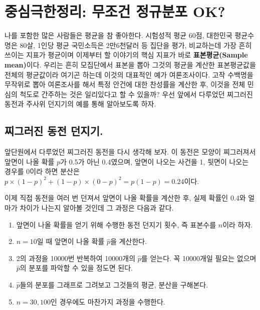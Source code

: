 \documentclass[]{book}
\providecommand{\tightlist}{%
  \setlength{\itemsep}{0pt}\setlength{\parskip}{0pt}}
\begin{document}
\hypertarget{uxc911uxc2ecuxadf9uxd55cuxc815uxb9ac-uxbb34uxc870uxac74-uxc815uxaddcuxbd84uxd3ec-ok}{%
\section{중심극한정리: 무조건 정규분포 OK?}\label{uxc911uxc2ecuxadf9uxd55cuxc815uxb9ac-uxbb34uxc870uxac74-uxc815uxaddcuxbd84uxd3ec-ok}}

나를 포함한 많은 사람들은 평균을 참 좋아한다. 시험성적 평균 60점, 대한민국 평균수명은 80살, 1인당 평균 국민소득은 2만6천달러 등 집단을 평가, 비교하는데 가장 흔히 쓰이는 지표가 평균이며 이제부터 할 이야기의 핵심 지표가 바로 \textbf{표본평균(Sample mean)}이다. 우리는 흔히 모집단에서 표본을 뽑아 그것의 평균을 계산한 표본평균값을 전체의 평균값이라 여기곤 하는데 이것의 대표적인 예가 여론조사이다. 고작 수백명을 무작위로 뽑아 여론조사를 해서 특정 안건에 대한 찬성률을 계산한 후, 이것을 전체 민심의 척도로 간주하는 것은 일리있다고 할 수 있을까? 우선 앞에서 다루었던 찌그러진 동전과 주사위 던지기의 예를 통해 알아보도록 하자.

\hypertarget{uxcc0cuxadf8uxb7ecuxc9c4-uxb3d9uxc804-uxb358uxc9c0uxae30.}{%
\subsection{찌그러진 동전 던지기.}\label{uxcc0cuxadf8uxb7ecuxc9c4-uxb3d9uxc804-uxb358uxc9c0uxae30.}}

앞단원에서 다루었던 찌그러진 동전을 다시 생각해 보자. 이 동전은 모양이 찌그러져서 앞면이 나올 확률 \(p\)가 0.5가 아닌 0.4였으며, 앞면이 나오는 사건을 1, 뒷면이 나오는 경우를 0이라 하면 분산은 \(p \times (1-p)^2 + (1-p) \times (0-p)^2 = p(1-p) = 0.24\)이다.

이제 직접 동전을 여러 번 던져서 앞면이 나올 확률을 계산한 후, 실제 확률인 0.4와 얼마가 차이가 나는지 알아볼 것인데 그 과정은 다음과 같다.

\begin{enumerate}
\def\labelenumi{\arabic{enumi}.}
\tightlist
\item
  앞면이 나올 확률을 얻기 위해 수행한 동전 던지기 횟수, 즉 표본수를 \(n\)이라 하자.
\item
  \(n=10\)일 때 앞면이 나올 확률 \(\hat{p}\)을 계산한다.
\item
  2의 과정을 10000번 반복하여 10000개의 \(\hat{p}\)를 얻는다. 꼭 10000개일 필요는 없으며 \(\hat{p}\)의 분포를 파악할 수 있을 정도면 된다.
\item
  \(\hat{p}\)들의 분포를 그래프로 그려보고 그것들의 평균, 분산을 구해본다.
\item
  \(n=30, 100\)인 경우에도 마찬가지 과정을 수행한다.
\end{enumerate}
\end{document}
